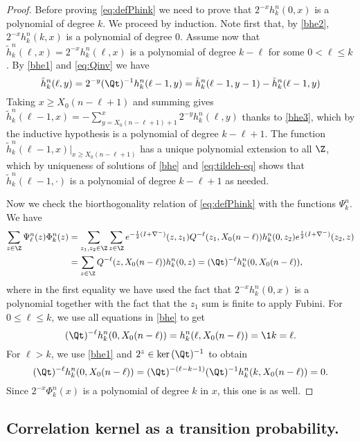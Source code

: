 \documentclass[]{pcmi}
\theoremstyle{plain}
\theoremstyle{definition}
\begin{document}
\begin{proof}
Before proving \eqref{eq:defPhink} we need to prove that $2^{-x}h^{n}_{k}(0,x)$ is a polynomial of degree $k$. We proceed by induction.
Note first that, by \eqref{bhe2}, $2^{-x}h^{n}_{k}(k,x)$ is a polynomial of degree 0.
Assume now that $\tilde h^n_k(\ell,x)=2^{-x}h^{n}_{k}(\ell,x)$ is a polynomial of degree $k-\ell$ for some $0<\ell\leq k$.
By \eqref{bhe1} and \eqref{eq:Qinv} we have
\begin{equation}\label{eq:tildeh-eq}
  \tilde h^{n}_{k}(\ell,y)=2^{-y}(\Qt)^{-1}h^{n}_{k}(\ell-1,y)=\tilde h^{n}_{k}(\ell-1,y-1)-\tilde h^{n}_{k}(\ell-1,y)
\end{equation}
Taking $x\geq X_0(n-\ell+1)$ and summing gives $\tilde h^{n}_{k}(\ell-1,x)=-\sum_{y=X_0(n-\ell+1)+1}^{x}2^{-y}h^{n}_{k}(\ell,y)$ thanks to \eqref{bhe3}, which by the inductive hypothesis is a polynomial of degree $k-\ell+1$.
The function\break$\tilde h^n_k(\ell-1,x)\big|_{x\geq X_0(n-\ell+1)}$ has a unique polynomial extension to all $\Z$, which by uniqueness of solutions of \eqref{bhe} and \eqref{eq:tildeh-eq} shows that $\tilde h^{n}_{k}(\ell-1,\cdot)$ is a polynomial of degree $k-\ell+1$ as needed.

Now we check the biorthogonality relation of \eqref{eq:defPhink} with the functions $\Psi^n_k$. We have
\begin{align*}
	\sum_{z\in\Z}\Psi^n_\ell(z)\Phi^n_k(z) &=\sum_{z_1,z_2\in\Z}\sum_{z\in\Z}e^{-\frac{t}{2} (I+\nabla^-)}(z,z_1)Q^{-\ell}(z_1,X_0(n-\ell))h^{n}_{k}(0,z_2)e^{\frac{t}{2} (I+\nabla^-)}(z_2,z)\\
	&=\sum_{z\in\Z}Q^{-\ell}(z,X_0(n-\ell))h^{n}_{k}(0,z)
	=(\Qt)^{-\ell}h^{n}_{k}(0,X_0(n-\ell)),
\end{align*}
where in the first equality we have used the fact that $2^{-x}h^n_k(0,x)$ is a polynomial together with the fact that the $z_1$ sum is finite to apply Fubini. For $0 \leq \ell\leq k$, we use all equations in \eqref{bhe} to get
\[
(\Qt)^{-\ell}h^{n}_{k}(0,X_0(n-\ell))=h^{n}_{k}(\ell,X_0(n-\ell))=\1{k=\ell}.
\]
For $\ell>k$, we use \eqref{bhe1} and $2^z\in\ker{(\Qt)^{-1}}$ to obtain
\[
(\Qt)^{-\ell}h^{n}_{k}(0,X_0(n-\ell))=(\Qt)^{-(\ell-k-1)}(\Qt)^{-1}h^{n}_{k}(k,X_0(n-\ell))=0.
\] 
Since $2^{-x}\Phi^n_k(x)$ is a polynomial of degree $k$ in $x$, this one is as well.
\end{proof}

\subsection{Correlation kernel as a transition probability.} 
\label{subsec:hitting}
\end{document}
